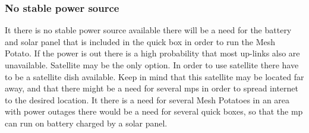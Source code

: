\subsubsection{No stable power source}
It there is no stable power source available there will be a need for the battery and solar panel that is included in the \gls{quick} box in order to run the Mesh Potato. If the power is out there is a high probability that most up-links also are unavailable. Satellite may be the only option. In order to use satellite there have to be a satellite dish available. Keep in mind that this satellite may be located far away, and that there might be a need for several \glspl{mp} in order to spread internet to the desired location. It there is a need for several Mesh Potatoes in an area with power outages there would be a need for several \gls{quick} boxes, so that the \gls{mp} can run on battery charged by a solar panel. 
